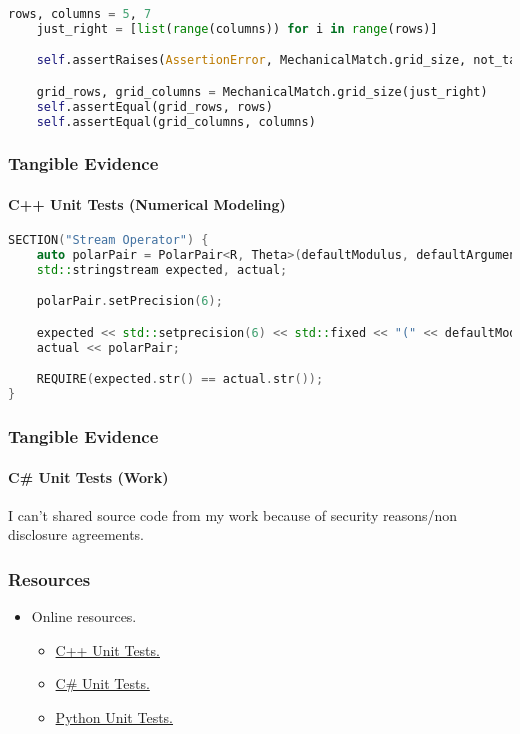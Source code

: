 \documentclass[xclolor=dvipsnames]{beamer}            %
\begin{document}
\begin{darkframes}
\begin{frame}[fragile]
\begin{lstlisting}[language=Python]
    rows, columns = 5, 7
    just_right = [list(range(columns)) for i in range(rows)]

    self.assertRaises(AssertionError, MechanicalMatch.grid_size, not_tall_enough)

    grid_rows, grid_columns = MechanicalMatch.grid_size(just_right)
    self.assertEqual(grid_rows, rows)
    self.assertEqual(grid_columns, columns)
        \end{lstlisting}
    \end{frame}

    \begin{frame}[fragile]
        \frametitle{Tangible Evidence}
        \framesubtitle{C++ Unit Tests (Numerical Modeling)}

        \footnotesize
        \begin{lstlisting}[language=C++]
SECTION("Stream Operator") {
    auto polarPair = PolarPair<R, Theta>(defaultModulus, defaultArgument);
    std::stringstream expected, actual;

    polarPair.setPrecision(6);

    expected << std::setprecision(6) << std::fixed << "(" << defaultModulus << ", " << defaultArgument << ")";
    actual << polarPair;

    REQUIRE(expected.str() == actual.str());
}
        \end{lstlisting}
    \end{frame}

    \begin{frame}[fragile]
        \frametitle{Tangible Evidence}
        \framesubtitle{C\# Unit Tests (Work)}

        I can't shared source code from my work because of security reasons/non disclosure agreements.
    \end{frame}

    \begin{frame}
        \frametitle{Resources}

        \begin{itemize}
            \item Online resources.
                \begin{itemize}
                    \item \href{https://github.com/catchorg/Catch2}{C++ Unit Tests.}
                    \item \href{https://msdn.microsoft.com/en-us/library/hh694602.aspx}{C\# Unit Tests.}
                    \item \href{https://docs.python.org/2/library/unittest.html}{Python Unit Tests.}
                \end{itemize}


\end{itemize}
\end{frame}
\end{darkframes}
\end{document}
